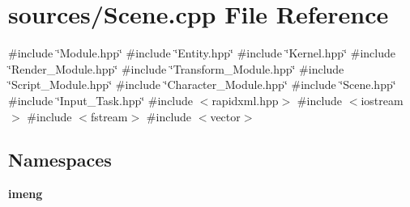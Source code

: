 \section{sources/\+Scene.cpp File Reference}
\label{_scene_8cpp}
{\ttfamily \#include \char`\"{}Module.\+hpp\char`\"{}}\newline
{\ttfamily \#include \char`\"{}Entity.\+hpp\char`\"{}}\newline
{\ttfamily \#include \char`\"{}Kernel.\+hpp\char`\"{}}\newline
{\ttfamily \#include \char`\"{}Render\+\_\+\+Module.\+hpp\char`\"{}}\newline
{\ttfamily \#include \char`\"{}Transform\+\_\+\+Module.\+hpp\char`\"{}}\newline
{\ttfamily \#include \char`\"{}Script\+\_\+\+Module.\+hpp\char`\"{}}\newline
{\ttfamily \#include \char`\"{}Character\+\_\+\+Module.\+hpp\char`\"{}}\newline
{\ttfamily \#include \char`\"{}Scene.\+hpp\char`\"{}}\newline
{\ttfamily \#include \char`\"{}Input\+\_\+\+Task.\+hpp\char`\"{}}\newline
{\ttfamily \#include $<$rapidxml.\+hpp$>$}\newline
{\ttfamily \#include $<$iostream$>$}\newline
{\ttfamily \#include $<$fstream$>$}\newline
{\ttfamily \#include $<$vector$>$}\newline
\subsection*{Namespaces}
\begin{DoxyCompactItemize}
\item 
 \textbf{ imeng}
\end{DoxyCompactItemize}

